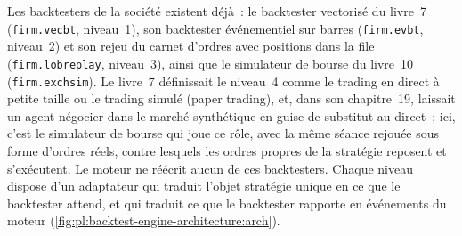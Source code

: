 Les backtesters de la société existent déjà~: le backtester vectorisé du livre~7 (\texttt{firm.vecbt}, niveau~1), son backtester événementiel
sur barres (\texttt{firm.evbt}, niveau~2) et son rejeu du carnet d'ordres avec positions dans la file (\texttt{firm.lobreplay}, niveau~3), ainsi que le simulateur de bourse du livre~10
(\texttt{firm.exchsim}). Le livre~7 définissait le niveau~4 comme le trading en direct à petite taille ou le trading simulé (paper trading), et, dans son chapitre~19, laissait un agent négocier
dans le marché synthétique en guise de substitut au direct~; ici, c'est le simulateur de bourse qui joue ce rôle, avec
la même séance rejouée sous forme d'ordres réels, contre lesquels les ordres propres de la stratégie reposent et s'exécutent. Le moteur ne réécrit aucun de
ces backtesters. Chaque niveau dispose d'un adaptateur qui traduit l'objet stratégie unique en ce que le backtester attend, et qui traduit ce que le backtester rapporte
en événements du moteur (\cref{fig:pl:backtest-engine-architecture:arch}).


